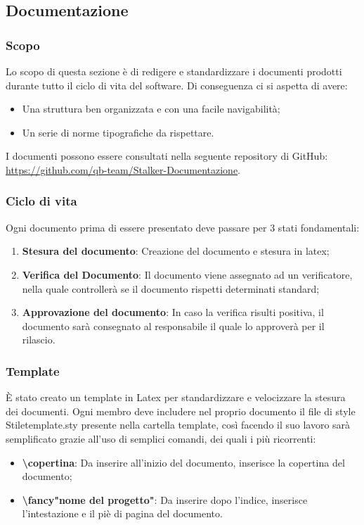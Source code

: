 \subsection{Documentazione}
\subsubsection{Scopo}
Lo scopo di questa sezione è di redigere e standardizzare i documenti prodotti durante tutto il ciclo di vita del software. 
Di conseguenza ci si aspetta di avere:
\begin{itemize}
\item Una struttura ben organizzata e con una facile navigabilità;
\item Un serie di norme tipografiche da rispettare.
\end{itemize}
I documenti possono essere consultati nella seguente repository di GitHub: \url{https://github.com/qb-team/Stalker-Documentazione}.

\subsubsection{Ciclo di vita}
Ogni documento prima di essere presentato deve passare per 3 stati fondamentali:
\begin{enumerate}
\item \textbf{Stesura del documento}: Creazione del documento e stesura in latex;
\item \textbf{Verifica del Documento}: Il documento viene assegnato ad un verificatore, nella quale controllerà se il documento rispetti determinati standard;
\item \textbf{Approvazione del documento}: In caso la verifica risulti positiva, il documento sarà consegnato al responsabile il quale lo approverà per il rilascio.
\end{enumerate}

\subsubsection{Template}
È stato creato un template in Latex per standardizzare e velocizzare la stesura dei documenti.
Ogni membro deve includere nel proprio documento il file di style Stiletemplate.sty presente nella cartella template, così facendo il suo lavoro sarà semplificato grazie all'uso di semplici comandi, dei quali i più ricorrenti:
\begin{itemize}
\item \textbf{\textbackslash copertina{}}: Da inserire all'inizio del documento, inserisce la copertina del documento;
\item \textbf{\textbackslash fancy"nome del progetto"{}}: Da inserire dopo l'indice, inserisce l'intestazione e il piè di pagina del documento.
\end{itemize}

